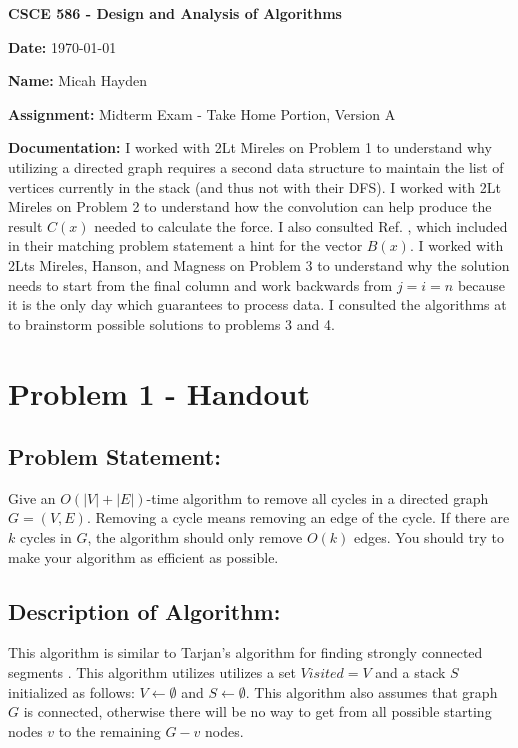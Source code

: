 \documentclass{article}
\begin{document}
\noindent \textbf{CSCE 586 - Design and Analysis of Algorithms}

\noindent \textbf{Date:}  \today 

\noindent \textbf{Name:}  Micah Hayden

\noindent \textbf{Assignment:}  Midterm Exam - Take Home Portion, Version A

\noindent \textbf{Documentation:} I worked with 2Lt Mireles on Problem 1 to understand why utilizing a directed graph requires a second data structure to maintain the list of vertices currently in the stack (and thus not with their DFS).  I worked with 2Lt Mireles on Problem 2 to understand how the convolution can help produce the result $C(x)$ needed to calculate the force.  I also consulted Ref. \cite{uic}, which included in their matching problem statement a hint for the vector $B(x)$. I worked with 2Lts Mireles, Hanson, and Magness  on Problem 3 to understand why the solution needs to start from the final column and work backwards from $j=i=n$ because it is the only day which guarantees to process data.  I consulted the algorithms at \cite{Git} to brainstorm possible solutions to problems 3 and 4.  

\hrulefill

\section*{Problem 1 - Handout}
\subsection*{Problem Statement:}  
Give an $O(|V| + |E|)$-time algorithm to remove all cycles in a directed graph $G = (V,E)$.  Removing a cycle means removing an edge of the cycle.  If there are $k$ cycles in $G$, the algorithm should only remove $O(k)$ edges.  You should try to make your algorithm as efficient as possible.

\subsection*{Description of Algorithm:}
This algorithm is similar to Tarjan's algorithm for finding strongly connected segments \cite{Tutorials}.  This algorithm utilizes utilizes a set $Visited = V$ and a stack $S$ initialized as follows: $V \gets \emptyset$ and $S \gets \emptyset$.  This algorithm also assumes that graph $G$ is connected, otherwise there will be no way to get from all possible starting nodes $v$ to the remaining $G - v$ nodes.
\end{document}
